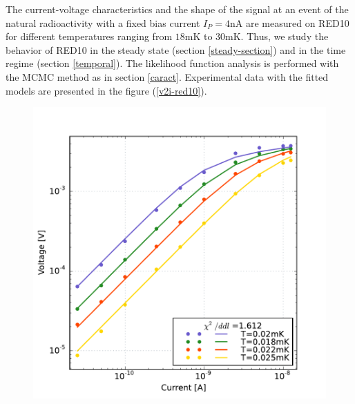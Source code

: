 The current-voltage characteristics and the shape of the signal at an event of the natural radioactivity with a fixed bias current $I_P=4$nA are measured on RED10 for different temperatures ranging from $18$mK to $30$mK. Thus, we study the behavior of RED10 in the steady state (section \ref{steady-section}) and in the time regime (section \ref{temporal}).
The likelihood function analysis is performed with the MCMC method as in section \ref{caract}. Experimental data with the fitted models are presented in the figure (\ref{v2i-red10}).

\begin{figure}[!ht]
\begin{minipage}{0.49\textwidth}
\includegraphics[width=\textwidth]{Figures/Ethem/v2i_red10.pdf}
\end{minipage}
\hfill
\begin{minipage}{0.49\textwidth}

\end{minipage}
\end{figure}
